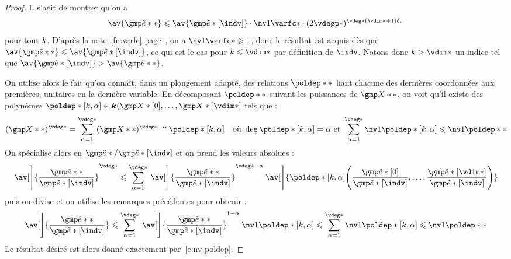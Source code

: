 \begin{proof}
  Il s'agit de montrer qu'on a
  \begin{equation}
    \av{ \cexa** }
    \le
    \av{ \cexa*[\indv] }
    \cdot \nv1{ \varfc* }
    \cdot ( 2 \vdegp* )^{\vdeg* (\vdim* + 1) \dv}
  \end{equation}
  pour tout \( k \). D'après la note~\ref{fn:varfc}
  page~\pageref{fn:varfc}, on a \( \nv1{ \varfc* } \ge 1 \), donc le résultat
  est acquis dès que \( \av{ \cexa** } \le \av{ \cexa*[\indv] } \), ce qui est
  le cas pour \( \ind \le \vdim* \) par définition de \( \indv \). Notons donc
  \( \ind > \vdim* \) un indice tel que \( \av{ \cexa*[\indv] } > \av{ \cexa**
    } \).

  On utilise alors le fait qu'on connaît, dans un plongement adapté, des
  relations \( \poldep** \) liant chacune des dernières coordonnées aux
  premières,  unitaires en la dernière variable. En décomposant \( \poldep**
  \) suivant les puissances de \( \vmp** \), on voit qu'il existe des
  polynômes \( \poldep*[\ind, \alpha] \in \cdn(\vmp*[0], \dots, \vmp*[\vdim*]
  \) tels que :
  \begin{equation}
    (\vmp**) ^{ \vdeg* }
    =
    \sum_{ \alpha=1 }^{ \vdeg* }
    (\vmp**) ^{ \vdeg* - \alpha }
    \, \poldep*[\ind, \alpha]
    \quad\text{où }
    \deg \poldep*[\ind, \alpha] = \alpha
    \text{ et }
    \sum_{ \alpha=1 }^{ \vdeg* } \nv1{ \poldep*[\ind, \alpha] }
    \le \nv1{ \poldep** }
  \end{equation}
  On spécialise alors en \( \cexa* / \cexa*[\indv] \) et on prend les valeurs
  absolues :
  \begin{equation}
    \av[\Bigg]{ \frac{ \cexa** }{ \cexa*[\indv] } }^{ \vdeg* }
    \le
    \sum_{ \alpha=1 }^{ \vdeg* }
    \: \av[\Bigg]{ \frac{ \cexa** }{ \cexa*[\indv] } }^{ \vdeg* - \alpha }
    \: \av[\Bigg]{
      \poldep*[\ind, \alpha] \Biggl(
        \frac{ \cexa*[0] }{ \cexa*[\indv] }, \dots,
        \frac{ \cexa*[\vdim*] }{ \cexa*[\indv] }
      \Biggr)
    }
  \end{equation}
  puis on divise et on utilise les remarques précédentes pour obtenir :
  \begin{align}
    \av[\Bigg]{ \frac{ \cexa** }{ \cexa*[\indv] } }
    \le
    \sum_{ \alpha=1 }^{ \vdeg* }
    \: \av[\Bigg]{ \frac{ \cexa** }{ \cexa*[\indv] } }^{ 1 - \alpha }
    \: \nv1{ \poldep*[\ind, \alpha] }
    \le
    \sum_{ \alpha=1 }^{ \vdeg* }
    \nv1{ \poldep*[\ind, \alpha] }
    \le
    \nv1{ \poldep** }
  \end{align}
  Le résultat désiré est alors donné exactement par~\eqref{e:nv-poldep}.
\end{proof}

